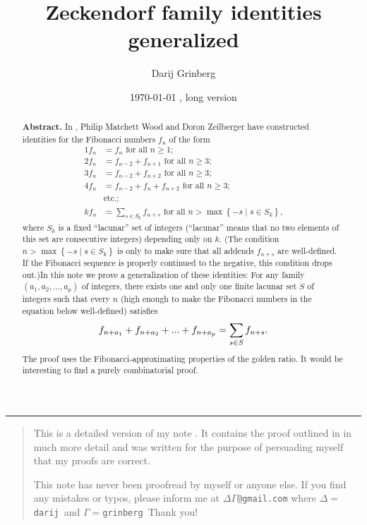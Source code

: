 \documentclass[numbers=enddot,12pt,final,onecolumn,notitlepage]{scrartcl}%
\numberwithin{exer}{section}
\theoremstyle{definition}
\newenvironment{statement}{\begin{quote}}{\end{quote}}
\let\sumnonlimits\sum
\renewcommand{\sum}{\sumnonlimits\limits}
\begin{document}
\title{Zeckendorf family identities generalized}
\author{Darij Grinberg}
\date{
\today
, long version}
\maketitle

\begin{abstract}
\textbf{Abstract.} In \cite{1}, Philip Matchett Wood and Doron Zeilberger have
constructed identities for the Fibonacci numbers $f_{n}$ of the form%
\begin{align*}
1f_{n}  &  =f_{n}\text{ for all }n\geq1;\\
2f_{n}  &  =f_{n-2}+f_{n+1}\text{ for all }n\geq3;\\
3f_{n}  &  =f_{n-2}+f_{n+2}\text{ for all }n\geq3;\\
4f_{n}  &  =f_{n-2}+f_{n}+f_{n+2}\text{ for all }n\geq3;\\
&  \text{etc.;}\\
kf_{n}  &  =\sum_{s\in S_{k}}f_{n+s}\text{ for all }n>\max\left\{  -s\mid s\in
S_{k}\right\}  \text{,}%
\end{align*}
where $S_{k}$ is a fixed ``lacunar'' set of integers (``lacunar'' means that
no two elements of this set are consecutive integers) depending only on $k$.
(The condition $n>\max\left\{  -s\mid s\in S_{k}\right\}  $ is only to make
sure that all addends $f_{n+s}$ are well-defined. If the Fibonacci sequence is
properly continued to the negative, this condition drops out.)\newline In this
note we prove a generalization of these identities: For any family $\left(
a_{1},a_{2},...,a_{p}\right)  $ of integers, there exists one and only one
finite lacunar set $S$ of integers such that every $n$ (high enough to make
the Fibonacci numbers in the equation below well-defined) satisfies
\[
f_{n+a_{1}}+f_{n+a_{2}}+...+f_{n+a_{p}}=\sum\limits_{s\in S}f_{n+s}.
\]
The proof uses the Fibonacci-approximating properties of the golden ratio. It
would be interesting to find a purely combinatorial proof.

\end{abstract}



\hrule


\begin{statement}
This is a detailed version of my note \cite{this.short}. It contains the proof
outlined in \cite{this.short} in much more detail and was written for the
purpose of persuading myself that my proofs are correct.

This note has never been proofread by myself or anyone else. If you find any
mistakes or typos, please inform me at $\Delta\Gamma$\texttt{@gmail.com} where
$\Delta=$\texttt{darij }and $\Gamma=$\texttt{grinberg }Thank you!
\end{statement}
\end{document}
